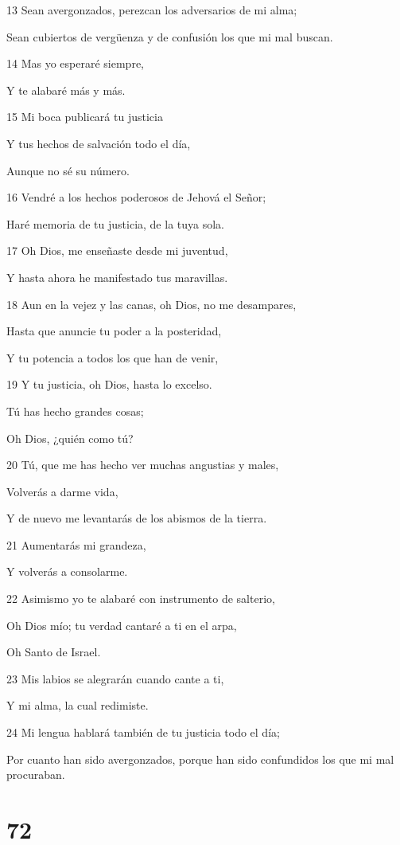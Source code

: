 \par 13 Sean avergonzados, perezcan los adversarios de mi alma;
\par Sean cubiertos de vergüenza y de confusión los que mi mal buscan.
\par 14 Mas yo esperaré siempre,
\par Y te alabaré más y más.
\par 15 Mi boca publicará tu justicia
\par Y tus hechos de salvación todo el día,
\par Aunque no sé su número.
\par 16 Vendré a los hechos poderosos de Jehová el Señor;
\par Haré memoria de tu justicia, de la tuya sola.
\par 17 Oh Dios, me enseñaste desde mi juventud,
\par Y hasta ahora he manifestado tus maravillas.
\par 18 Aun en la vejez y las canas, oh Dios, no me desampares,
\par Hasta que anuncie tu poder a la posteridad,
\par Y tu potencia a todos los que han de venir,
\par 19 Y tu justicia, oh Dios, hasta lo excelso.
\par Tú has hecho grandes cosas;
\par Oh Dios, ¿quién como tú?
\par 20 Tú, que me has hecho ver muchas angustias y males,
\par Volverás a darme vida,
\par Y de nuevo me levantarás de los abismos de la tierra.
\par 21 Aumentarás mi grandeza,
\par Y volverás a consolarme.
\par 22 Asimismo yo te alabaré con instrumento de salterio,
\par Oh Dios mío; tu verdad cantaré a ti en el arpa,
\par Oh Santo de Israel.
\par 23 Mis labios se alegrarán cuando cante a ti,
\par Y mi alma, la cual redimiste.
\par 24 Mi lengua hablará también de tu justicia todo el día;
\par Por cuanto han sido avergonzados, porque han sido confundidos los que mi mal procuraban.

\chapter{72}

